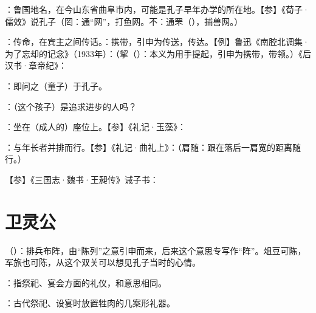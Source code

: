 {
\begin{lyitemize}
\item {}：鲁国地名，在今山东省曲阜市内，可能是孔子早年办学的所在地。【参】《荀子·儒效》说孔子（罔：通“网”，打鱼网。不：通罘（），捕兽网。）%
\item {}：传命，在宾主之间传话。：携带，引申为传送，传达。【例】鲁迅《南腔北调集·为了忘却的记念》（1933年）：（挈（）：本义为用手提起，引申为携带，带领。）《后汉书·章帝纪》：
\item {}：即问之（童子）于孔子。
\item {}：（这个孩子）是追求进步的人吗？
\item {}：坐在（成人的）座位上。【参】《礼记·玉藻》：
\item {}：与年长者并排而行。【参】《礼记·曲礼上》：（肩随：跟在落后一肩宽的距离随行。）
\end{lyitemize}
【参】《三国志·魏书·王昶传》诫子书：
}
{}  %



\chapter{卫灵公}

{
\item {}（）：排兵布阵，由“陈列”之意引申而来，后来这个意思专写作“阵”。俎豆可陈，军旅也可陈，从这个双关可以想见孔子当时的心情。
\item {}：指祭祀、宴会方面的礼仪，和意思相同。

：古代祭祀、设宴时放置牲肉的几案形礼器。
}
{}


